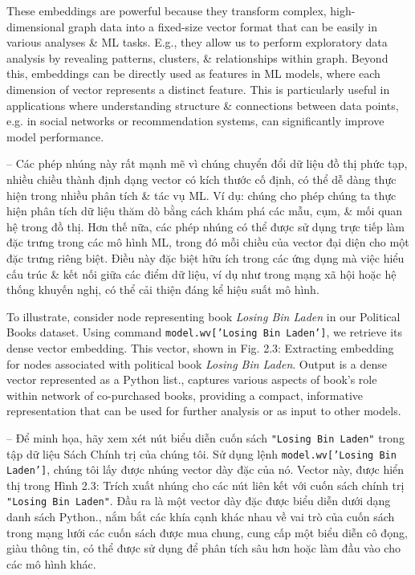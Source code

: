 \documentclass{article}
\begin{document}
\begin{itemize}
\begin{itemize}
\begin{itemize}
           These embeddings are powerful because they transform complex, high-dimensional graph data into a fixed-size vector format that can be easily in various analyses \& ML tasks. E.g., they allow us to perform exploratory data analysis by revealing patterns, clusters, \& relationships within graph. Beyond this, embeddings can be directly used as features in ML models, where each dimension of vector represents a distinct feature. This is particularly useful in applications where understanding structure \& connections between data points, e.g. in social networks or recommendation systems, can significantly improve model performance.

           -- Các phép nhúng này rất mạnh mẽ vì chúng chuyển đổi dữ liệu đồ thị phức tạp, nhiều chiều thành định dạng vector có kích thước cố định, có thể dễ dàng thực hiện trong nhiều phân tích \& tác vụ ML. Ví dụ: chúng cho phép chúng ta thực hiện phân tích dữ liệu thăm dò bằng cách khám phá các mẫu, cụm, \& mối quan hệ trong đồ thị. Hơn thế nữa, các phép nhúng có thể được sử dụng trực tiếp làm đặc trưng trong các mô hình ML, trong đó mỗi chiều của vector đại diện cho một đặc trưng riêng biệt. Điều này đặc biệt hữu ích trong các ứng dụng mà việc hiểu cấu trúc \& kết nối giữa các điểm dữ liệu, ví dụ như trong mạng xã hội hoặc hệ thống khuyến nghị, có thể cải thiện đáng kể hiệu suất mô hình.

           To illustrate, consider node representing book {\it Losing Bin Laden} in our Political Books dataset. Using command {\tt model.wv['Losing Bin Laden']}, we retrieve its dense vector embedding. This vector, shown in {\sf Fig. 2.3: Extracting embedding for nodes associated with political book {\it Losing Bin Laden}. Output is a dense vector represented as a Python list.}, captures various aspects of book's role within network of co-purchased books, providing a compact, informative representation that can be used for further analysis or as input to other models.

           -- Để minh họa, hãy xem xét nút biểu diễn cuốn sách {\tt "Losing Bin Laden"} trong tập dữ liệu Sách Chính trị của chúng tôi. Sử dụng lệnh {\tt model.wv['Losing Bin Laden']}, chúng tôi lấy được nhúng vector dày đặc của nó. Vector này, được hiển thị trong {\sf Hình 2.3: Trích xuất nhúng cho các nút liên kết với cuốn sách chính trị {\tt "Losing Bin Laden"}. Đầu ra là một vector dày đặc được biểu diễn dưới dạng danh sách Python.}, nắm bắt các khía cạnh khác nhau về vai trò của cuốn sách trong mạng lưới các cuốn sách được mua chung, cung cấp một biểu diễn cô đọng, giàu thông tin, có thể được sử dụng để phân tích sâu hơn hoặc làm đầu vào cho các mô hình khác.


\end{itemize}
\end{itemize}
\end{itemize}
\end{document}
